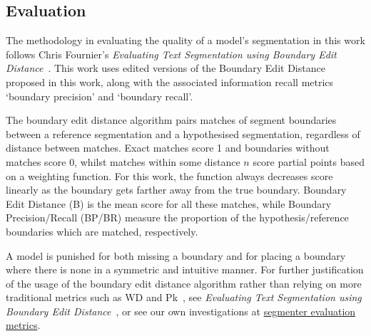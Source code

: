 \subsection{Evaluation}

The methodology in evaluating the quality of a model’s segmentation in this work follows Chris Fournier's \emph{Evaluating Text Segmentation using Boundary Edit Distance}~\cite{fournier-2013-B}. This work uses edited versions of the Boundary Edit Distance proposed in this work, along with the associated information recall metrics ‘boundary precision’ and ‘boundary recall’. 

The boundary edit distance algorithm pairs matches of segment boundaries between a reference segmentation and a hypothesised segmentation, regardless of distance between matches. Exact matches score 1 and boundaries without matches score 0, whilst matches within some distance $n$ score partial points based on a weighting function. For this work, the function always decreases score linearly as the boundary gets farther away from the true boundary. Boundary Edit Distance (B) is the mean score for all these matches, while Boundary Precision/Recall (BP/BR) measure the proportion of the hypothesis/reference boundaries which are matched, respectively. 

A model is punished for both missing a boundary and for placing a boundary where there is none in a symmetric and intuitive manner. For further justification of the usage of the boundary edit distance algorithm rather than relying on more traditional metrics such as WD and Pk~\cite{HearstW2002}, see \emph{Evaluating Text Segmentation using Boundary Edit Distance}~\cite{fournier-2013-B}, or see our own investigations at \href{https://github.com/PierreRL/segmenter-evaluation-metrics}{segmenter evaluation metrics}.